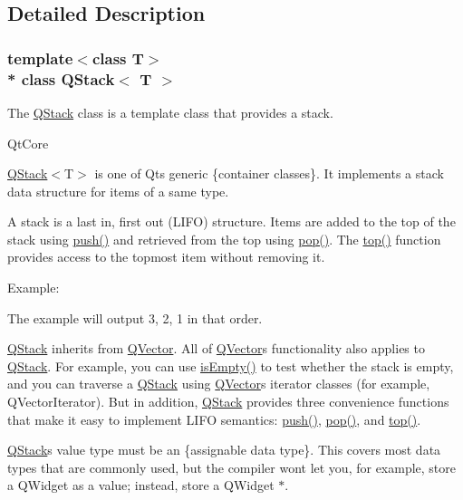 \subsection{Detailed Description}
\subsubsection*{template$<$class T$>$\\*
class Q\+Stack$<$ T $>$}

The \hyperlink{class_q_stack}{Q\+Stack} class is a template class that provides a stack. 

Qt\+Core

\hyperlink{class_q_stack}{Q\+Stack}$<$T$>$ is one of Qt\textquotesingle{}s generic \{container classes\}. It implements a stack data structure for items of a same type.

A stack is a last in, first out (L\+I\+FO) structure. Items are added to the top of the stack using \hyperlink{class_q_stack_afe6cdb317571080fa991ba998db2801e}{push()} and retrieved from the top using \hyperlink{class_q_stack_ad2944420ebf35829a8f7c54d75ea8a35}{pop()}. The \hyperlink{class_q_stack_a3253bfc5509f9c4afffe60b10326961d}{top()} function provides access to the topmost item without removing it.

Example\+:


\begin{DoxyCodeInclude}
\end{DoxyCodeInclude}
 The example will output 3, 2, 1 in that order.

\hyperlink{class_q_stack}{Q\+Stack} inherits from \hyperlink{class_q_vector}{Q\+Vector}. All of \hyperlink{class_q_vector}{Q\+Vector}\textquotesingle{}s functionality also applies to \hyperlink{class_q_stack}{Q\+Stack}. For example, you can use \hyperlink{class_q_vector_a23ddd6fbfe38f8c34f69b5af89e97000}{is\+Empty()} to test whether the stack is empty, and you can traverse a \hyperlink{class_q_stack}{Q\+Stack} using \hyperlink{class_q_vector}{Q\+Vector}\textquotesingle{}s iterator classes (for example, Q\+Vector\+Iterator). But in addition, \hyperlink{class_q_stack}{Q\+Stack} provides three convenience functions that make it easy to implement L\+I\+FO semantics\+: \hyperlink{class_q_stack_afe6cdb317571080fa991ba998db2801e}{push()}, \hyperlink{class_q_stack_ad2944420ebf35829a8f7c54d75ea8a35}{pop()}, and \hyperlink{class_q_stack_a3253bfc5509f9c4afffe60b10326961d}{top()}.

\hyperlink{class_q_stack}{Q\+Stack}\textquotesingle{}s value type must be an \{assignable data type\}. This covers most data types that are commonly used, but the compiler won\textquotesingle{}t let you, for example, store a Q\+Widget as a value; instead, store a Q\+Widget $\ast$.

